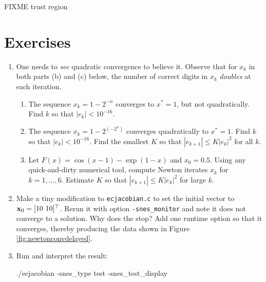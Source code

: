 FIXME trust region


\section{Exercises}

\renewcommand{\labelenumi}{\arabic{chapter}.\arabic{enumi}\quad}
\renewcommand{\labelenumii}{(\alph{enumii})}
\begin{enumerate}
\item One needs to \emph{see} quadratic convergence to believe it.  Observe that for $x_k$ in both parts (b) and (c) below, the number of correct digits in $x_k$ \emph{doubles} at each iteration.
    \begin{enumerate}
    \item The sequence $x_k = 1-2^{-n}$ converges to $x^*=1$, but not quadratically.  Find $k$ so that $|e_k| < 10^{-16}$.
    \item The sequence $x_k = 1-2^{(-2^n)}$ converges quadratically to $x^*=1$.  Find $k$ so that $|e_k| < 10^{-16}$.  Find the smallest $K$ so that $|e_{k+1}| \le K |e_k|^2$ for all $k$.
    \item Let $F(x) = \cos(x-1) - \exp(1-x)$ and $x_0=0.5$.  Using any quick-and-dirty numerical tool, compute Newton iterates $x_k$ for $k=1,\dots,6$.  Estimate $K$ so that $|e_{k+1}| \le K |e_k|^2$ for large $k$.
    \end{enumerate}

\item Make a tiny modification to \texttt{ecjacobian.c} to set the initial vector to $\mathbf{x}_0 = [10\,\, 10]^\top$.  Rerun it with option \texttt{-snes\_monitor} and note it does not converge to a solution.  Why does the \pSNES stop?  Add one runtime option so that it converges, thereby producing the data shown in Figure \ref{fig:newtonconvdelayed}.

\item \label{exer:nl:snestestdisplay}  Run and interpret the result:
\begin{cline}
./ecjacobian -snes_type test -snes_test_display
\end{cline}


\end{enumerate}
